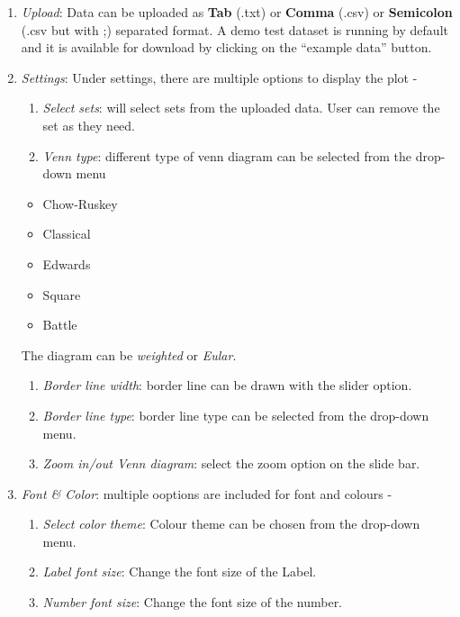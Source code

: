 \documentclass[
  a4paper,
  oneside,
  open=any]{scrreport}
\providecommand{\tightlist}{%
  \setlength{\itemsep}{0pt}\setlength{\parskip}{0pt}}\usepackage{longtable,booktabs,array}
\begin{document}
\begin{enumerate}
\def\labelenumi{\arabic{enumi}.}
\item
  \emph{Upload}: Data can be uploaded as \textbf{Tab} (.txt) or
  \textbf{Comma} (.csv) or \textbf{Semicolon} (.csv but with ;)
  separated format. A demo test dataset is running by default and it is
  available for download by clicking on the ``example data'' button.
\item
  \emph{Settings}: Under settings, there are multiple options to display
  the plot -

  \begin{enumerate}
  \def\labelenumii{\roman{enumii}.}
  \tightlist
  \item
    \emph{Select sets}: will select sets from the uploaded data. User
    can remove the set as they need.
  \item
    \emph{Venn type}: different type of venn diagram can be selected
    from the drop-down menu
  \end{enumerate}

  \begin{itemize}
  \tightlist
  \item
    Chow-Ruskey
  \item
    Classical
  \item
    Edwards
  \item
    Square
  \item
    Battle
  \end{itemize}

  The diagram can be \emph{weighted} or \emph{Eular}.

  \begin{enumerate}
  \def\labelenumii{\roman{enumii}.}
  \setcounter{enumii}{2}
  \item
    \emph{Border line width}: border line can be drawn with the slider
    option.
  \item
    \emph{Border line type}: border line type can be selected from the
    drop-down menu.
  \item
    \emph{Zoom in/out Venn diagram}: select the zoom option on the slide
    bar.
  \end{enumerate}
\item
  \emph{Font \& Color}: multiple ooptions are included for font and
  colours -

  \begin{enumerate}
  \def\labelenumii{\roman{enumii}.}
  \item
    \emph{Select color theme}: Colour theme can be chosen from the
    drop-down menu.
  \item
    \emph{Label font size}: Change the font size of the Label.
  \item
    \emph{Number font size}: Change the font size of the number.
  \end{enumerate}
\end{enumerate}
\end{document}

